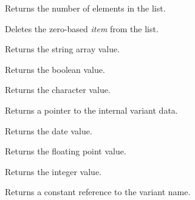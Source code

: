 \label{wxvariantgetcount}


Returns the number of elements in the list.

\label{wxvariantdelete}


Deletes the zero-based {\it item} from the list.

\label{wxvariantgetarraystring}


Returns the string array value.

\label{wxvariantgetbool}


Returns the boolean value.

\label{wxvariantgetchar}


Returns the character value.

\label{wxvariantgetdata}


Returns a pointer to the internal variant data.

\label{wxvariantgetdatetime}


Returns the date value.

\label{wxvariantgetdouble}


Returns the floating point value.

\label{wxvariantgetlong}


Returns the integer value.

\label{wxvariantgetname}


Returns a constant reference to the variant name.

